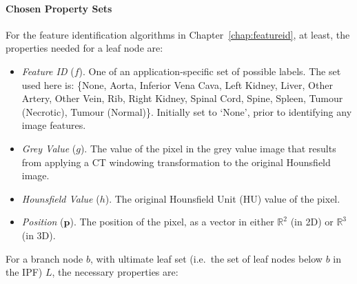 \paragraph{Chosen Property Sets}

For the feature identification algorithms in Chapter~\ref{chap:featureid}, at least, the properties needed for a leaf node are:

\begin{itemize}

\item \emph{Feature ID} ($f$). One of an application-specific set of possible labels. The set used here is: \{None, Aorta, Inferior Vena Cava, Left Kidney, Liver, Other Artery, Other Vein, Rib, Right Kidney, Spinal Cord, Spine, Spleen, Tumour (Necrotic), Tumour (Normal)\}. Initially set to `None', prior to identifying any image features.

\item \emph{Grey Value} ($g$). The value of the pixel in the grey value image that results from applying a CT windowing transformation to the original Hounsfield image.

\item \emph{Hounsfield Value} ($h$). The original Hounsfield Unit (HU) value of the pixel.

\item \emph{Position} ($\mathbf{p}$). The position of the pixel, as a vector in either $\mathbb{R}^2$ (in 2D) or $\mathbb{R}^3$ (in 3D).

\end{itemize}

\noindent For a branch node $b$, with ultimate leaf set (i.e.~the set of leaf nodes below $b$ in the IPF) $L$, the necessary properties are:

